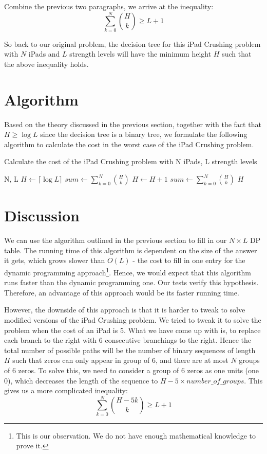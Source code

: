 \documentclass[12pt,a4paper,oneside]{report}
\begin{document}
Combine the previous two paragraphs, we arrive at the inequality: \[\sum_{k=0}^{N} {H \choose k} \geq L+1\]

So back to our original problem, the decision tree for this iPad Crushing problem with $N$ iPads and $L$ strength levels will have the minimum height $H$ such that the above inequality holds.

\section{Algorithm}
Based on the theory discussed in the previous section, together with the fact that $H \geq \log L$ since the decision tree is a binary tree, we formulate the following algorithm to calculate the cost in the worst case of the iPad Crushing problem.

\begin{algorithm}
        \caption{Calculate the cost of the iPad Crushing problem with N iPads, L strength levels}
        \begin{algorithmic}[1]
            \REQUIRE N, L
	\STATE $H \leftarrow \lceil \log L\rceil$
	\STATE $sum \leftarrow \sum_{k=0}^{N} {H \choose k}$
		\STATE $H \leftarrow H+1$
		\STATE $sum \leftarrow \sum_{k=0}^{N} {H \choose k}$
	\ENDWHILE
	\RETURN $H$
        \end{algorithmic}
\end{algorithm}

\section{Discussion}
We can use the algorithm outlined in the previous section to fill in our $N \times L$ DP table. The running time of this algorithm is dependent on the size of the answer it gets, which grows slower than $O(L)$ - the cost to fill in one entry for the dynamic programming approach\footnote{This is our observation. We do not have enough mathematical knowledge to prove it.}. Hence, we would expect that this algorithm runs faster than the dynamic programming one. Our tests verify this hypothesis. Therefore, an advantage of this approach would be its faster running time.

However, the downside of this approach is that it is harder to tweak to solve modified versions of the iPad Crushing problem. We tried to tweak it to solve the problem when the cost of an iPad is 5. What we have come up with is, to replace each branch to the right with 6 consecutive branchings to the right. Hence the total number of possible paths will be the number of binary sequences of length $H$ such that zeros can only appear in group of 6, and there are at most $N$ groups of 6 zeros. To solve this, we need to consider a group of 6 zeros as one units (one 0), which decreases the length of the sequence to $H - 5 \times number\_of\_groups$. This gives us a more complicated inequality: \[\sum_{k=0}^{N} {H-5k \choose k} \geq L+1\]
\end{document}
